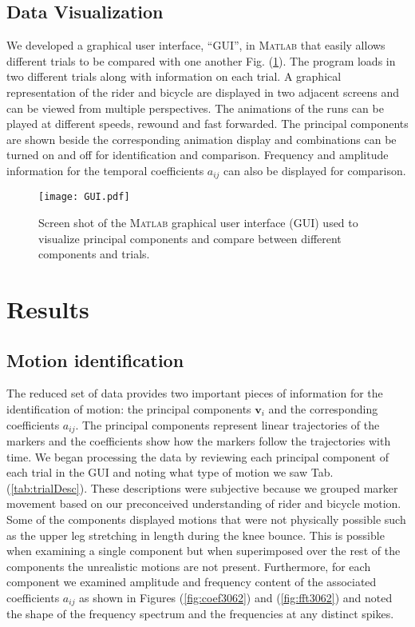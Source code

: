\documentclass[smallextended]{svjour3}     %
\begin{document}
\subsection{Data Visualization}
\label{sec:dataVis}
We developed a graphical user interface, ``GUI'',  in \textsc{Matlab} that easily allows
different trials to be compared with one another Fig. (\ref{fig:GUI}). The
program loads in two different trials along with information on each trial. A
graphical representation of the rider and bicycle are displayed in two adjacent
screens and can be viewed from multiple perspectives. The animations of the
runs can be played at different speeds, rewound and fast forwarded. The
principal components are shown beside the corresponding animation display and
combinations can be turned on and off for identification and comparison.
Frequency and amplitude information for the temporal coefficients $a_{ij}$ can
also be displayed for comparison.
\begin{figure}[tbp]
    \begin{center}
        \texttt{[image: GUI.pdf]}
    \end{center}
    \caption{Screen shot of the \textsc{Matlab} graphical user interface (GUI)
    used to visualize principal components and compare between different
    components and trials.}
    \label{fig:GUI}
\end{figure}

\section{Results}
\label{sec:results}
\subsection{Motion identification}
\label{sec:motionId}
The reduced set of data provides two important pieces of information for the
identification of motion: the principal components $\mathbf{v}_i$ and the
corresponding coefficients $a_{ij}$. The principal components represent linear
trajectories of the markers and the coefficients show how the markers follow
the trajectories with time. We began processing the data by reviewing each
principal component of each trial in the GUI and noting what type of
motion we saw Tab. (\ref{tab:trialDesc}). These descriptions were subjective
because we grouped marker movement based on our preconceived understanding of
rider and bicycle motion. Some of the components displayed motions that were not
physically possible such as the upper leg stretching in length during the knee
bounce. This is possible when examining a single component but when
superimposed over the rest of the components the unrealistic motions are not
present. Furthermore, for each component we examined amplitude and frequency
content of the associated coefficients $a_{ij}$ as shown in Figures
(\ref{fig:coef3062}) and (\ref{fig:fft3062}) and noted the shape of the
frequency spectrum and the
frequencies at any distinct spikes.
\end{document}
